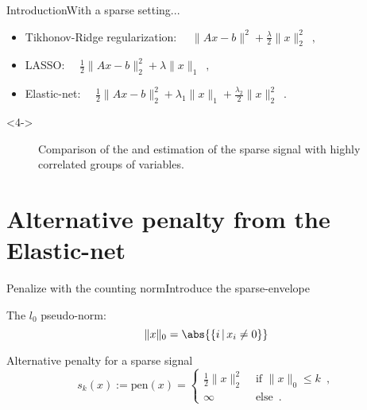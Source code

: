 \documentclass[10pt,aspectratio=43]{beamer}
\begin{document}
\begin{frame}{Introduction}{With a sparse setting...}

    \begin{itemize}
        \item<1-> Tikhonov-Ridge regularization:    $\quad\|Ax-b\|^2 + \frac{\lambda}{2}\|x\|_2^2\enspace,$
        \item<2-> LASSO:
        $\quad\frac{1}{2}\|Ax-b\|^2_2 + \lambda \|x\|_1\enspace,$
        \item<3-> Elastic-net:
        $\quad\frac{1}{2}\|Ax-b\|^2_2 + \lambda_1 \|x\|_1 +  \frac{\lambda_2}{2}\|x\|^2_2\enspace.$
        \end{itemize}
        \begin{onlyenv}<4->
\begin{figure}[ht]\centering
\caption{Comparison of the \lasso and \enet estimation of the sparse signal with highly correlated groups of variables.}
\vspace{-.1cm}



\end{figure}
        \end{onlyenv}
\end{frame}


\section[Alternative penalty]{Alternative penalty from the Elastic-net}

\begin{frame}{Penalize with the counting norm}{Introduce the sparse-envelope}

{ The $l_0$ pseudo-norm:
\begin{equation*}
\|x\|_0 = \abs{\{i\,|\, x_i\neq 0\}}
\end{equation*}}
\medskip
\begin{block}{Alternative penalty for a sparse signal}
\[s_k(x):=\mathrm{pen}(x)=\begin{cases}
\frac{1}{2}\|x\|^2_2 & \text{ if }\|x\|_0\leq k\enspace, \\ \infty &\text{ else}\enspace.\end{cases}\]
\end{block}
\end{frame}
\end{document}
